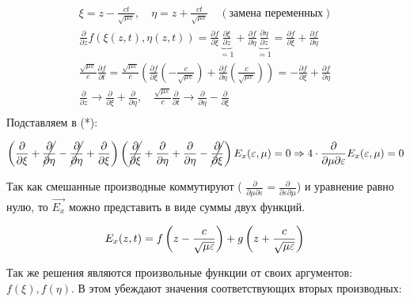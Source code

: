 \documentclass[12pt, a4paper]{report}
\begin{document}
\begin{gather*}
    \xi = z - \frac{c t}{ \sqrt{\mu \varepsilon} }, \quad \eta = z + \frac{c t}{ \sqrt{\mu \varepsilon} } \quad ( \text{замена переменных} )  \\
    \frac{\partial}{\partial z } f ( \xi ( z,t), \eta(z,t) ) = \frac{\partial f}{\partial \xi }  \underbrace{\frac{\partial \xi }{\partial z }}_{=1} + \frac{\partial f }{\partial \eta  }   \underbrace{\frac{\partial \eta }{\partial z }}_{=1}= \frac{\partial f}{\partial \xi } + \frac{\partial f}{ \partial \eta } \\
    \frac{\sqrt{\mu \varepsilon}}{c}  \frac{\partial f }{\partial t}      = \frac{\sqrt{\mu \varepsilon}}{c} \left( \frac{\partial f }{\partial \xi } \left( - \frac{c}{\sqrt{\mu \varepsilon}}\right) + \frac{\partial f}{\partial \eta } \left( \frac{c}{\sqrt{\mu \varepsilon}}  \right)  \right)=- \frac{\partial f}{\partial \xi } + \frac{\partial f}{ \partial \eta }  \\ 
    \frac{\partial}{\partial z } \to  \frac{\partial}{\partial \xi } + \frac{\partial}{\partial \eta }, \quad \frac{\sqrt{\mu \varepsilon}}{c}\frac{\partial}{\partial t} \to \frac{\partial}{\partial \eta }- \frac{\partial }{\partial \xi } \\
\end{gather*} 
Подставляем в (*):

\[     \left( \frac{\partial }{\partial \xi  }+ \cancel{\frac{\partial}{\partial \eta }}  - \cancel{\frac{\partial}{\partial \eta }}  + \frac{\partial}{\partial \xi  }     \right) \left( \cancel{\frac{\partial}{\partial \xi }}  +\frac{\partial}{\partial \eta } +\frac{\partial}{\partial \eta } - \cancel{\frac{\partial}{\partial \xi }}  \right) E_x ( \varepsilon,\mu)= 0 \Rightarrow  4 \cdot \frac{\partial}{ \partial\mu \partial\varepsilon}E_x ( \varepsilon,\mu)= 0  \] 

Так как смешанные производные коммутируют ( \(\displaystyle  \frac{\partial}{\partial \mu \partial \varepsilon}= \frac{\partial}{\partial \varepsilon \partial \mu}   \)) и уравнение равно нулю, то \( \vec{E_x} \) можно представить в виде суммы двух функций.

\[     E_x (z,t) = f \left(z- \frac{c}{\sqrt{ \mu \varepsilon }}   \right)+ g \left(  z+ \frac{c}{\sqrt{ \mu \varepsilon }} \right) \\ 
\] 

Так же решения являются произвольные функции от своих аргументов: \( f(\xi) , f(\eta) \). В этом убеждают значения соответствующих вторых производных:
\end{document}

